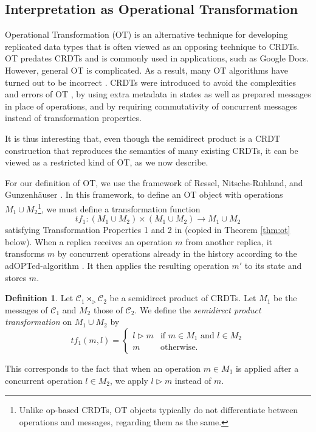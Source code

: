 \documentclass[acmsmall,nonacm,12pt]{acmart}
\newcommand{\mc}[1]{\ensuremath{\mathcal{#1}}}
\newcommand{\ra}{\rightarrow}
\newcommand{\act}{\triangleright}
\theoremstyle{plain}
\theoremstyle{definition}
\newtheorem{mydef}[mythm]{Definition}
\begin{document}
\subsection{Interpretation as Operational Transformation}
\label{sec:ot}
Operational Transformation (OT) is an alternative technique for developing replicated data types that is often viewed as an opposing technique to CRDTs.  OT predates CRDTs and is commonly used in applications, such as Google Docs.  However, general OT is complicated.  As a result, many OT algorithms have turned out to be incorrect \cite{ot_correctness}.  CRDTs were introduced to avoid the complexities and errors of OT \cite{treedoc_crdt, crdt_survey_2011}, by using extra metadata in states as well as prepared messages in place of operations, and by requiring commutativity of concurrent messages instead of transformation properties.

It is thus interesting that, even though the semidirect product is a CRDT construction that reproduces the semantics of many existing CRDTs, it can be viewed as a restricted kind of OT, as we now describe.

For our definition of OT, we use the framework of Ressel, Nitsche-Ruhland, and Gunzenh\"auser \cite{ot_ressel}.  In this framework, to define an OT object with operations $M_1 \cup M_2$\footnote{Unlike op-based CRDTs, OT objects typically do not differentiate between operations and messages, regarding them as the same.}, we must define a transformation function $$tf_1: (M_1 \cup M_2) \times (M_1 \cup M_2) \ra M_1 \cup M_2$$ satisfying Transformation Properties 1 and 2 in \cite{ot_ressel} (copied in Theorem \ref{thm:ot} below).  When a replica receives an operation $m$ from another replica, it transforms $m$ by concurrent operations already in the history according to the adOPTed-algorithm \cite[Figure 8]{ot_ressel}.  It then applies the resulting operation $m'$ to its state and stores $m$.

\begin{mydef}
Let $\mc{C}_1 \rtimes_\act \mc{C}_2$ be a semidirect product of CRDTs.  Let $M_1$ be the messages of $\mc{C}_1$ and $M_2$ those of $\mc{C}_2$.  We define the \textit{semidirect product transformation} on $M_1 \cup M_2$ by
\[
tf_1(m, l) = \begin{cases} l \act m &\mbox{if $m \in M_1$ and $l \in M_2$} \\ m &\mbox{otherwise.} \end{cases}
\]
\end{mydef}
This corresponds to the fact that when an operation $m \in M_1$ is applied after a concurrent operation $l \in M_2$, we apply $l \act m$ instead of $m$.
\end{document}
